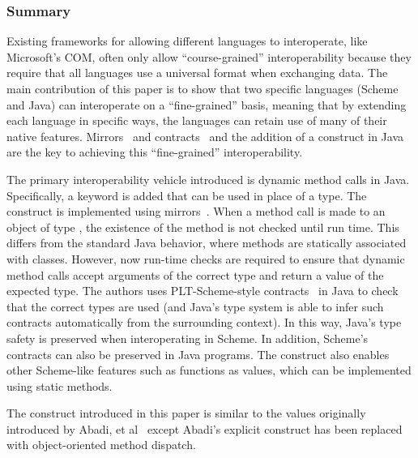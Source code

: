 \documentclass[12pt]{article}	%
\begin{document}
\subsubsection*{Summary}
Existing frameworks for allowing different languages to interoperate, like Microsoft's COM, often only allow ``course-grained'' interoperability because they require that all languages use a universal format when exchanging data. The main contribution of this paper is to show that two specific languages (Scheme and Java) can interoperate on a ``fine-grained'' basis, meaning that by extending each language in specific ways, the languages can retain use of many of their native features. Mirrors~\cite{Bracha2004Mirrors} and contracts~\cite{Findler2002Contracts} and the addition of a \dynamic construct in Java are the key to achieving this ``fine-grained'' interoperability.

The primary interoperability vehicle introduced is dynamic method calls in Java. Specifically, a \dynamic keyword is added that can be used in place of a type. The \dynamic construct is implemented using mirrors~\cite{Bracha2004Mirrors}. When a method call is made to an object of type \dynamic, the existence of the method is not checked until run time. This differs from the standard Java behavior, where methods are statically associated with classes. However, now run-time checks are required to ensure that dynamic method calls accept arguments of the correct type and return a value of the expected type. The authors uses PLT-Scheme-style contracts~\cite{Findler2002Contracts} in Java to check that the correct types are used (and Java's type system is able to infer such contracts automatically from the surrounding context). In this way, Java's type safety is preserved when interoperating in Scheme. In addition, Scheme's contracts can also be preserved in Java programs. The \dynamic construct also enables other Scheme-like features such as functions as values, which can be implemented using \dynamic static methods.

The \dynamic construct introduced in this paper is similar to the \Dynamic values originally introduced by Abadi, et al~\cite{Abadi1991Dynamic} except Abadi's explicit \typecase construct has been replaced with object-oriented method dispatch.




\end{document}
